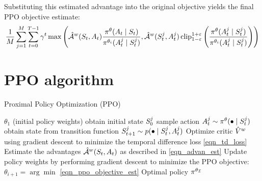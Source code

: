 \documentclass[12pt,twoside]{../../mitthesis}
\begin{document}
Substituting this estimated advantage into the original objective yields the final PPO objective estimate:
\begin{equation}
    \label{eqn_ppo_objective_est}
    \frac{1}{M} \sum_{j = 1}^M \sum_{t=0}^{T-1} \gamma ^ t \max\left(\hat{\mathcal A}^{w}(S_t, A_t)   \frac{\pi^{\theta}(A_t \mid S_t)}{\pi^{\theta_i}(A_t^j \mid S_t^j)}, \hat{\mathcal A}^{w}(S_t^j, A_t^j) \operatorname{clip}_{1 - \varepsilon}^{1 + \varepsilon}\left(\frac{\pi^{\theta}(A_t^j \mid S_t^j)}{\pi^{\theta_i}(A_t^j \mid S_t^j)}\right) \right)
\end{equation}

\section*{PPO algorithm}
\begin{algorithm}
    \caption{Proximal Policy Optimization (PPO)}
    \label{alg:my-alg}
    \begin{algorithmic}
     $\theta_1$ (initial policy weights)
            \STATE obtain initial state $S_0^{j}$
                \STATE sample action $A_t^j \sim \pi^{\theta}(\bullet \mid S_t^{j})$
                \STATE obtain state from transition function $S_{t+1}^j \sim p(\bullet \mid S_t^j, A_t^j)$
            \ENDFOR
        \ENDFOR
        \STATE Optimize critic $\hat{V}^{w}$ using gradient descent to minimize the temporal difference loss \eqref{eqn_td_loss}
        \STATE Estimate the advantages $\hat{\mathcal A}^{w}(S_t, A_t)$ as described in \eqref{eqn_advan_est} 
        \STATE Update policy weights by performing gradient descent to minimize the PPO objective: $\theta_{i + 1} = \arg\min$ \eqref{eqn_ppo_objective_est}
    \ENDFOR
    \STATE \RETURN Optimal policy $\pi^{\theta_{\mathcal I}}$
    \end{algorithmic}
\end{algorithm}
\end{document}
